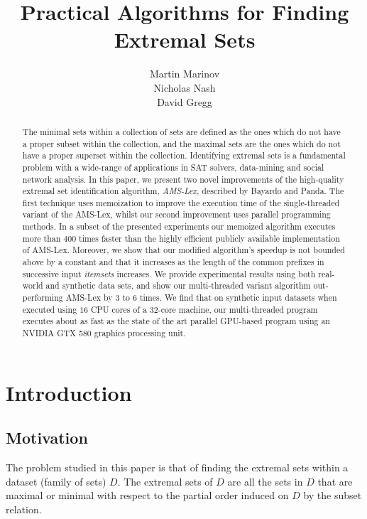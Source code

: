\documentclass[13pt,a4paper]{article}
\begin{document}
\title{Practical Algorithms for Finding Extremal Sets}
\author{Martin Marinov\\ Nicholas Nash\\ David Gregg}
\maketitle


\begin{abstract}
The minimal sets within a collection of sets are defined as the ones which do not have a proper subset within the collection, and the maximal sets are the ones which do not have a proper superset within the collection. Identifying extremal sets is a fundamental problem with a wide-range of applications in SAT solvers, data-mining and social network analysis. In this paper, we present two novel improvements of the high-quality extremal set identification algorithm, \textit{AMS-Lex}, described by Bayardo and Panda. The first technique uses memoization to improve the execution time of the single-threaded variant of the AMS-Lex, whilst our second improvement uses parallel programming methods. In a subset of the presented experiments our memoized algorithm executes more than $400$ times faster than the highly efficient publicly available implementation of AMS-Lex. Moreover, we show that our modified algorithm's speedup is not bounded above by a constant and that it increases as the length of the common prefixes in successive input \textit{itemsets} increases. We provide experimental results using both real-world and synthetic data sets, and show our multi-threaded variant algorithm out-performing AMS-Lex by $3$ to $6$ times. We find that on synthetic input datasets when executed using $16$ CPU cores of a $32$-core machine, our multi-threaded program executes about as fast as the state of the art parallel GPU-based program using an NVIDIA GTX 580 graphics processing unit.
\end{abstract}


\section{Introduction}
\label{sec:intro}
\subsection{Motivation}
\label{sec:intro:back+motiv}
\noindent

The problem studied in this paper is that of finding the extremal sets within a dataset (family of sets) $D$. The extremal sets of $D$ are all the sets in $D$ that are maximal or minimal with respect to the partial order induced on $D$ by the subset relation.
\end{document}
